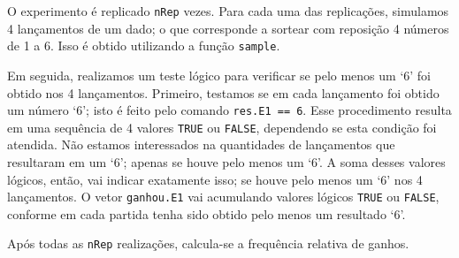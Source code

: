 \documentclass[
]{book}
\theoremstyle{definition}
\theoremstyle{definition}
\theoremstyle{definition}
\theoremstyle{remark}
\begin{document}
O experimento é replicado \texttt{nRep} vezes. Para cada uma das replicações, simulamos 4 lançamentos de um dado; o que corresponde a sortear com reposição 4 números de 1 a 6. Isso é obtido utilizando a função \texttt{sample}.

Em seguida, realizamos um teste lógico para verificar se pelo menos um `6' foi obtido nos 4 lançamentos. Primeiro, testamos se em cada lançamento foi obtido um número `6'; isto é feito pelo comando \texttt{res.E1\ ==\ 6}. Esse procedimento resulta em uma sequência de 4 valores \texttt{TRUE} ou \texttt{FALSE}, dependendo se esta condição foi atendida. Não estamos interessados na quantidades de lançamentos que resultaram em um `6'; apenas se houve pelo menos um `6'. A soma desses valores lógicos, então, vai indicar exatamente isso; se houve pelo menos um `6' nos 4 lançamentos. O vetor \texttt{ganhou.E1} vai acumulando valores lógicos \texttt{TRUE} ou \texttt{FALSE}, conforme em cada partida tenha sido obtido pelo menos um resultado `6'.

Após todas as \texttt{nRep} realizações, calcula-se a frequência relativa de ganhos.
\end{document}
